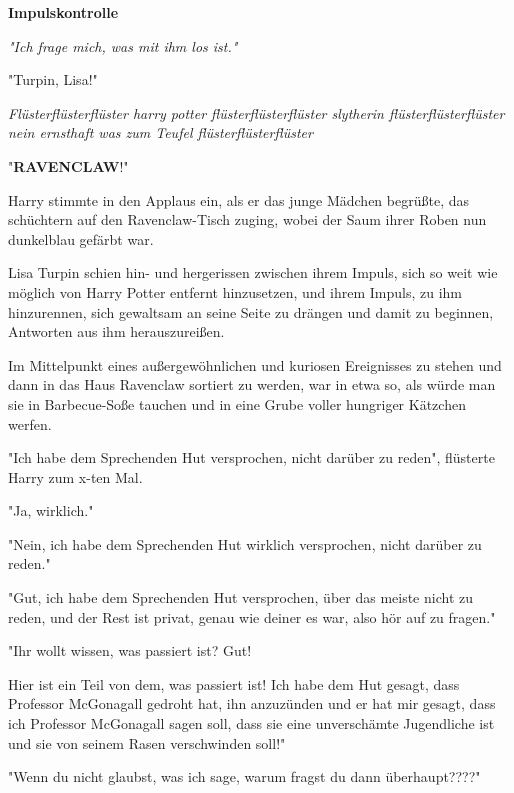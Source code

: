 

\hypertarget{impulskontrolle}{%

\textbf{Impulskontrolle}

\emph{"Ich frage mich, was mit ihm los ist."}

"Turpin, Lisa!"

\emph{Flüsterflüsterflüster harry potter flüsterflüsterflüster slytherin flüsterflüsterflüster nein ernsthaft was zum Teufel flüsterflüsterflüster}

"\textbf{RAVENCLAW}!"

Harry stimmte in den Applaus ein, als er das junge Mädchen begrüßte, das schüchtern auf den Ravenclaw-Tisch zuging, wobei der Saum ihrer Roben nun dunkelblau gefärbt war.

Lisa Turpin schien hin- und hergerissen zwischen ihrem Impuls, sich so weit wie möglich von Harry Potter entfernt hinzusetzen, und ihrem Impuls, zu ihm hinzurennen, sich gewaltsam an seine Seite zu drängen und damit zu beginnen, Antworten aus ihm herauszureißen.

Im Mittelpunkt eines außergewöhnlichen und kuriosen Ereignisses zu stehen und dann in das Haus Ravenclaw sortiert zu werden, war in etwa so, als würde man sie in Barbecue-Soße tauchen und in eine Grube voller hungriger Kätzchen werfen.

"Ich habe dem Sprechenden Hut versprochen, nicht darüber zu reden", flüsterte Harry zum x-ten Mal.

"Ja, wirklich."

"Nein, ich habe dem Sprechenden Hut wirklich versprochen, nicht darüber zu reden."

"Gut, ich habe dem Sprechenden Hut versprochen, über das meiste nicht zu reden, und der Rest ist privat, genau wie deiner es war, also hör auf zu fragen."

"Ihr wollt wissen, was passiert ist? Gut!

Hier ist ein Teil von dem, was passiert ist! Ich habe dem Hut gesagt, dass Professor McGonagall gedroht hat, ihn anzuzünden und er hat mir gesagt, dass ich Professor McGonagall sagen soll, dass sie eine unverschämte Jugendliche ist und sie von seinem Rasen verschwinden soll!"

"Wenn du nicht glaubst, was ich sage, warum fragst du dann überhaupt????"

}
